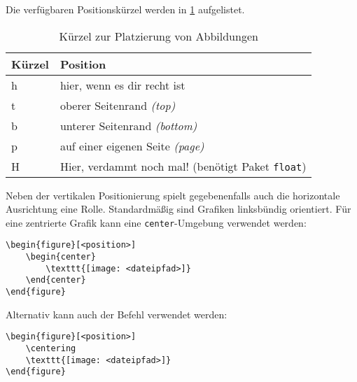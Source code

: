 \noindent Die verfügbaren Positionskürzel werden in \cref{tbl:positionskuerzel} aufgelistet.

\begin{table}[h!]
	\center
	\begin{tabular}{ll}
		\toprule
		Kürzel & Position                              \\
		\midrule
		h      & hier, wenn es dir recht ist           \\
		t      & oberer Seitenrand \emph{(top)}        \\
		b      & unterer Seitenrand \emph{(bottom)}    \\
		p      & auf einer eigenen Seite \emph{(page)} \\
		H      & Hier, verdammt noch mal! (benötigt Paket \texttt{float}) \\
		\bottomrule
	\end{tabular}
	\caption{Kürzel zur Platzierung von Abbildungen}
	\label{tbl:positionskuerzel}
\end{table}

Neben der vertikalen Positionierung spielt gegebenenfalls auch die horizontale Ausrichtung eine Rolle. Standardmäßig sind Grafiken linksbündig orientiert. Für eine zentrierte Grafik kann eine \texttt{center}-Umgebung verwendet werden:

\begin{verbatim}
\begin{figure}[<position>]
	\begin{center}
    	\texttt{[image: <dateipfad>]}
	\end{center}
\end{figure}
\end{verbatim}

\noindent Alternativ kann auch der Befehl \texttt{\centering} verwendet werden:

\begin{verbatim}
\begin{figure}[<position>]
	\centering
	\texttt{[image: <dateipfad>]}
\end{figure}
\end{verbatim}


